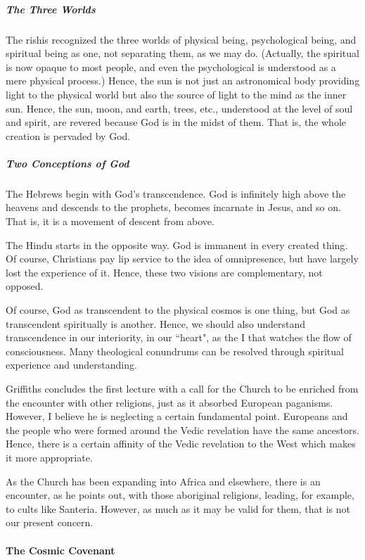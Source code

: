 \subparagraph{The Three Worlds}
The rishis recognized the three worlds of physical being, psychological being, and spiritual being as one, not separating them, as we may do. (Actually, the spiritual is now opaque to most people, and even the psychological is understood as a mere physical process.) Hence, the sun is not just an astronomical body providing light to the physical world but also the source of light to the mind as the inner sun. Hence, the sun, moon, and earth, trees, etc., understood at the level of soul and spirit, are revered because God is in the midst of them. That is, the whole creation is pervaded by God.

\subparagraph{Two Conceptions of God}
The Hebrews begin with God's transcendence. God is infinitely high above the heavens and descends to the prophets, becomes incarnate in Jesus, and so on. That is, it is a movement of descent from above.

The Hindu starts in the opposite way. God is immanent in every created thing. Of course, Christians pay lip service to the idea of omnipresence, but have largely lost the experience of it. Hence, these two visions are complementary, not opposed.

Of course, God as transcendent to the physical cosmos is one thing, but God as transcendent spiritually is another. Hence, we should also understand transcendence in our interiority, in our ``heart", as the I that watches the flow of consciousness. Many theological conundrums can be resolved through spiritual experience and understanding.

Griffiths concludes the first lecture with a call for the Church to be enriched from the encounter with other religions, just as it absorbed European paganisms. However, I believe he is neglecting a certain fundamental point. Europeans and the people who were formed around the Vedic revelation have the same ancestors. Hence, there is a certain affinity of the Vedic revelation to the West which makes it more appropriate.

As the Church has been expanding into Africa and elsewhere, there is an encounter, as he points out, with those aboriginal religions, leading, for example, to cults like Santeria. However, as much as it may be valid for them, that is not our present concern.

\paragraph{The Cosmic Covenant}

